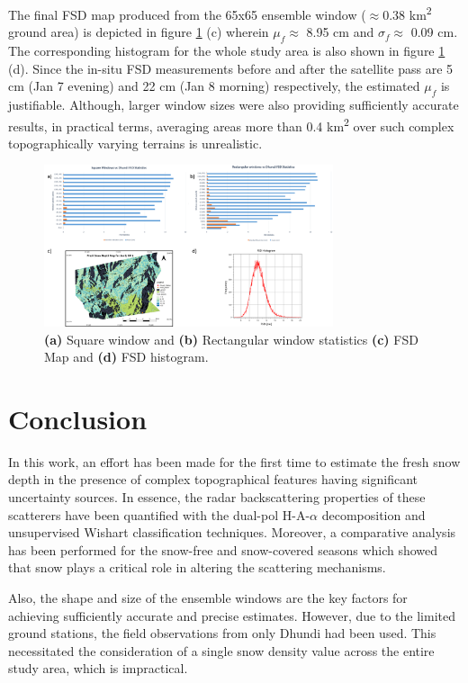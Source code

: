 \documentclass{article}
\begin{document}
The final FSD map produced from the 65x65 ensemble window ($\approx$0.38 km\textsuperscript{2} ground area) is depicted in figure \ref{fig:fsd_map} (c) wherein $\mu_f \approx$ 8.95 cm and $\sigma_f \approx$ 0.09 cm. The corresponding histogram for the whole study area is also shown in figure \ref{fig:fsd_map} (d). Since the in-situ FSD measurements before and after the satellite pass are 5 cm (Jan 7 evening) and 22 cm (Jan 8 morning) respectively, the estimated $\mu_f$ is justifiable. Although, larger window sizes were also providing sufficiently accurate results, in practical terms, averaging areas more than 0.4 km\textsuperscript{2} over such complex topographically varying terrains is unrealistic.

\begin{figure}[htb]
\centering
\includegraphics[width=8.5cm]{All.png}
\vspace{-2ex}
\caption{\textbf{(a)} Square window and \textbf{(b)} Rectangular window statistics \textbf{(c)} FSD Map and \textbf{(d)} FSD histogram.}
\label{fig:fsd_map}
\end{figure}

\section{Conclusion}
\label{sec:concl}
In this work, an effort has been made for the first time to estimate the fresh snow depth in the presence of complex topographical features having significant uncertainty sources. In essence, the radar backscattering properties of these scatterers have been quantified with the dual-pol H-A-$\alpha$ decomposition and unsupervised Wishart classification techniques. Moreover, a comparative analysis has been performed for the snow-free and snow-covered seasons which showed that snow plays a critical role in altering the scattering mechanisms. 

Also, the shape and size of the ensemble windows are the key factors for achieving sufficiently accurate and precise estimates. However, due to the limited ground stations, the field observations from only Dhundi had been used. This necessitated the consideration of a single snow density value across the entire study area, which is impractical.
\end{document}
